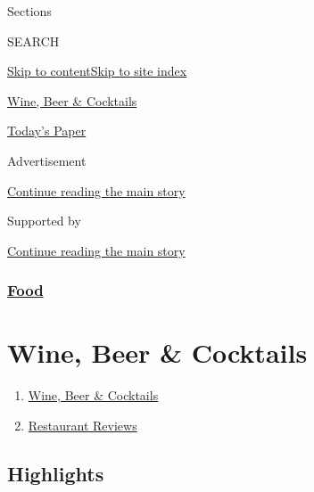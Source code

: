 Sections

SEARCH

\protect\hyperlink{site-content}{Skip to
content}\protect\hyperlink{site-index}{Skip to site index}

\href{https://www.nytimes3xbfgragh.onion/section/food/drinks}{Wine, Beer
\& Cocktails}

\href{https://myaccount.nytimes3xbfgragh.onion/auth/login?response_type=cookie\&client_id=vi}{}

\href{https://www.nytimes3xbfgragh.onion/section/todayspaper}{Today's
Paper}

Advertisement

\protect\hyperlink{after-top}{Continue reading the main story}

Supported by

\protect\hyperlink{after-sponsor}{Continue reading the main story}

\hypertarget{food}{%
\subsubsection{\texorpdfstring{\href{/section/food}{Food}}{Food}}\label{food}}

\hypertarget{wine-beer--cocktails}{%
\section{Wine, Beer \& Cocktails}\label{wine-beer--cocktails}}

\begin{enumerate}
\def\labelenumi{\arabic{enumi}.}
\tightlist
\item
  \href{/section/food/drinks}{Wine, Beer \& Cocktails}
\item
  \href{/reviews/dining}{Restaurant Reviews}
\end{enumerate}

\hypertarget{highlights}{%
\subsection{Highlights}\label{highlights}}

